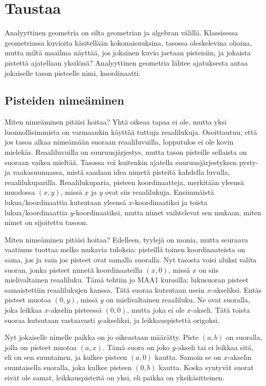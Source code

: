 \section{Taustaa}


Analyyttinen geometria on silta geometrian ja algebran välillä. Klassisessa geometriassa kuvioita käsitellään kokonaisuuksina, tasossa oleskelevina olioina, mutta miltä maailma näyttää, jos jokainen kuvio jaetaan pisteisiin, ja jokaista pistettä ajatellaan yksilönä? Analyyttinen geometria lähtee ajatuksesta antaa jokaiselle tason pisteelle nimi, koordinaatti.

\subsection{Pisteiden nimeäminen}

Miten nimeäminen pitäisi hoitaa? Yhtä oikeaa tapaa ei ole, mutta yksi luonnollisimmista on varmaankin käyttää tuttuja reaalilukuja. Osoittautuu, että jos tasoa alkaa nimeämään suoraan reaaliluvuilla, lopputulos ei ole kovin mielekäs. Reaaliluvuilla on suuruusjärjestys, mutta tason pisteille sellaista on suoraan vaikea mieltää. Tasossa voi kuitenkin ajatella suuruusjärjestyksen pysty- ja vaakasuunnassa, mistä saadaan idea nimetä pisteitä kahdella luvulla, reaalilukuparilla. Reaalilukuparia, pisteen koordinaatteja, merkitään yleensä muodossa $(x,y)$, missä $x$ ja $y$ ovat siis reaalilukuja. Ensimmäistä lukua/koordinaattia kutsutaan yleensä $x$-koordinaatiksi ja toista lukua/koordinaattia $y$-koordinaatiksi, mutta nimet vaihtelevat sen mukaan, miten nimet on sijoitettu tasoon.

Miten nimeäminen pitäisi hoitaa? Edelleen, tyylejä on monia, mutta seuraava vaatimus tuottaa melko mukavia tuloksia: pisteillä toinen koordinaateista on sama, jos ja vain jos pisteet ovat samalla suoralla. Nyt tasosta voisi aluksi valita suoran, jonka pisteet nimetä koordinaateilla $(x,0)$, missä $x$ on siis mielivaltainen reaaliluku. Tämä tehtiin jo MAA1 kurssilla; lukusuoran pisteet samaistettiin reaalilukujen kanssa. Tätä suoraa kutsutaan usein $x$-akseliksi. Entäs pisteet muotoa $(0,y)$, missä $y$ on mielivaltainen reaaliluku. Ne ovat suoralla, joka leikkaa $x$-akselin pisteessä $(0,0)$, mutta joka ei ole $x$-akseli. Tätä toista suoraa kutsutaan vastaavasti $y$-akseliksi, ja leikkauspistettä origoksi.

Nyt jokaiselle nimelle paikka on jo oikeastaan määrätty. Piste $(a,b)$ on suoralla, jolla on pisteet muotoa $(a,x)$. Tämä suora on joko $y$-akseli tai ei leikkaa sitä, eli on sen suuntainen, ja kulkee pisteen $(a,0)$ kautta. Samoin se on $x$-akselin suuntaisella suoralla, joka kulkee pisteen $(0,b)$ kautta. Koska syntyvät suorat eivät ole samat, leikkauspisteitä on yksi, eli paikka on yksikäsitteinen.

